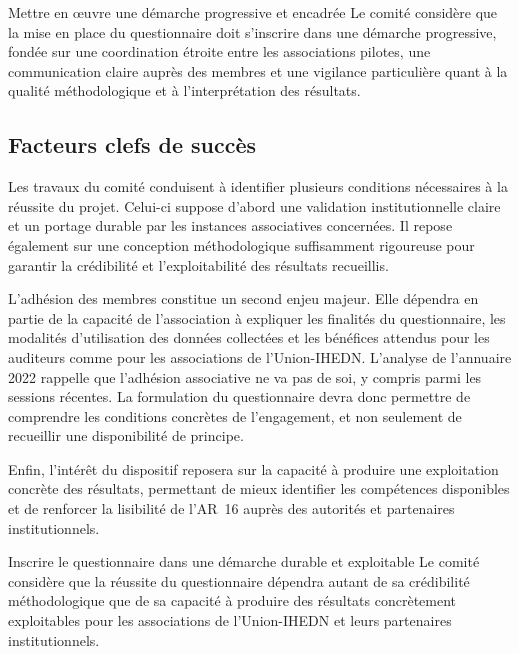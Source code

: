 \documentclass[12pt,a4paper]{article}
\newcommand{\UnionIHEDN}{Union-IHEDN}
\newcommand{\AssociationsUnionIHEDN}{associations de l'\UnionIHEDN}
\newcommand{\ARSeize}{AR~16}
\begin{document}
\begin{proposition}{Mettre en œuvre une démarche progressive et encadrée}
Le comité considère que la mise en place du questionnaire doit s'inscrire dans une démarche progressive, fondée sur une coordination étroite entre les associations pilotes, une communication claire auprès des membres et une vigilance particulière quant à la qualité méthodologique et à l'interprétation des résultats.
\end{proposition}

\clearpage

\subsection{Facteurs clefs de succès}

Les travaux du comité conduisent à identifier plusieurs conditions nécessaires à la réussite du projet. Celui-ci suppose d'abord une validation institutionnelle claire et un portage durable par les instances associatives concernées. Il repose également sur une conception méthodologique suffisamment rigoureuse pour garantir la crédibilité et l'exploitabilité des résultats recueillis.

L'adhésion des membres constitue un second enjeu majeur. Elle dépendra en partie de la capacité de l'association à expliquer les finalités du questionnaire, les modalités d'utilisation des données collectées et les bénéfices attendus pour les auditeurs comme pour les \AssociationsUnionIHEDN. L'analyse de l'annuaire 2022 rappelle que l'adhésion associative ne va pas de soi, y compris parmi les sessions récentes. La formulation du questionnaire devra donc permettre de comprendre les conditions concrètes de l'engagement, et non seulement de recueillir une disponibilité de principe.

Enfin, l'intérêt du dispositif reposera sur la capacité à produire une exploitation concrète des résultats, permettant de mieux identifier les compétences disponibles et de renforcer la lisibilité de l'\ARSeize{} auprès des autorités et partenaires institutionnels.

\begin{proposition}{Inscrire le questionnaire dans une démarche durable et exploitable}
Le comité considère que la réussite du questionnaire dépendra autant de sa crédibilité méthodologique que de sa capacité à produire des résultats concrètement exploitables pour les \AssociationsUnionIHEDN{} et leurs partenaires institutionnels.
\end{proposition}
\end{document}
